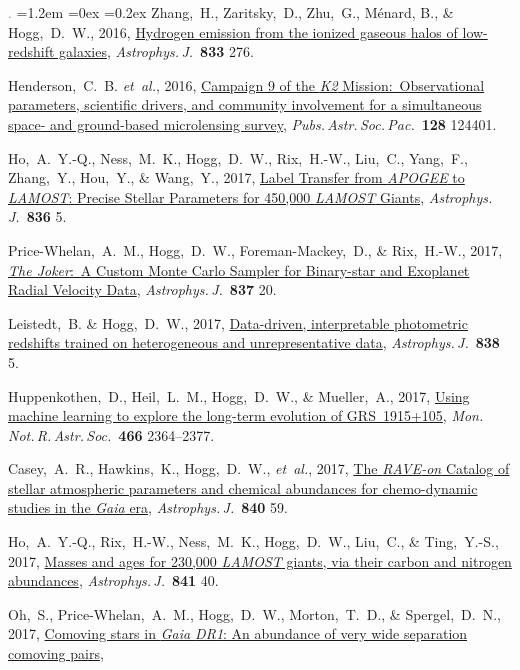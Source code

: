 \documentclass[10pt,letterpaper]{article}
\newcommand{\acronym}[1]{{\small{#1}}}
\newcommand{\foreign}[1]{\textsl{#1}}
\newcommand{\etal}{\foreign{et~al.}}
\newcommand{\project}[1]{\textsl{#1}}
\newcommand{\doi}[2]{\href{http://dx.doi.org/#1}{{#2}}}
\newcommand{\deemph}[1]{\textcolor{grey}{\footnotesize{#1}}}
\newcommand{\pubnumber}[1]{\deemph{{#1}.}}
\newcounter{refpubnum}
\newcommand{\hogglist}{%
    \rightmargin=0in
    \leftmargin=1.2em
    \topsep=0ex
    \partopsep=0pt
    \itemsep=0.2ex
    \parsep=0pt
    \itemindent=-1.0\leftmargin
    \listparindent=0.0\leftmargin
    \settowidth{\labelsep}{~}
    \usecounter{refpubnum}
  }
\begin{document}
\begin{list}{\pubnumber{\therefpubnum}}{\hogglist}
Zhang,~H., Zaritsky,~D., Zhu,~G., M\'enard, B., \& Hogg,~D.~W., 2016,
\doi{10.3847/1538-4357/833/2/276}{Hydrogen emission from the ionized gaseous halos of low-redshift galaxies},
\textit{Astrophys.\,J.}\ \textbf{833} 276.
\item
Henderson,~C.~B. \etal, 2016,
\doi{10.1088/1538-3873/128/970/124401}{Campaign 9 of the \project{\acronym{K2}} Mission:\ 
Observational parameters, scientific drivers, and community involvement
for a simultaneous space- and ground-based microlensing survey},
\textit{Pubs.\,Astr.\,Soc.\,Pac.}\ \textbf{128} 124401.
\item
Ho,~A.~Y.-Q., Ness,~M.~K., Hogg,~D.~W., Rix,~H.-W., Liu,~C., Yang,~F., Zhang,~Y.,
Hou,~Y., \& Wang,~Y., 2017,
\doi{10.3847/1538-4357/836/1/5}{Label Transfer from \project{\acronym{APOGEE}} to \project{\acronym{LAMOST}}: Precise Stellar Parameters for 450,000 \project{\acronym{LAMOST}} Giants},
\textit{Astrophys.\,J.}\ \textbf{836} 5.
\item
Price-Whelan,~A.~M., Hogg,~D.~W., Foreman-Mackey,~D., \& Rix,~H.-W., 2017,
\doi{10.3847/1538-4357/aa5e50}{\project{The Joker}:\ A Custom Monte Carlo Sampler for Binary-star and Exoplanet Radial Velocity Data},
\textit{Astrophys.\,J.}\ \textbf{837} 20.
\item
Leistedt,~B. \& Hogg,~D.~W., 2017,
\doi{10.3847/1538-4357/aa6332}{Data-driven, interpretable photometric redshifts trained on heterogeneous and unrepresentative data},
\textit{Astrophys.\,J.}\ \textbf{838} 5.
\item
Huppenkothen,~D., Heil,~L.~M., Hogg,~D.~W., \& Mueller,~A., 2017,
\doi{10.1093/mnras/stw3190}{Using machine learning to explore the long-term evolution of \acronym{GRS~1915+105}},
\textit{Mon.\,Not.\,R.\,Astr.\,Soc.}\ \textbf{466} 2364--2377.
\item
Casey,~A.~R., Hawkins,~K., Hogg,~D.~W., \etal, 2017,
\doi{10.3847/1538-4357/aa69c2}{The \project{\acronym{RAVE}-on} Catalog of stellar atmospheric parameters and chemical abundances for chemo-dynamic studies in the \project{Gaia} era},
\textit{Astrophys.\,J.}\ \textbf{840} 59.
\item
Ho,~A.~Y.-Q., Rix,~H.-W., Ness,~M.~K., Hogg,~D.~W., Liu,~C., \& Ting,~Y.-S., 2017,
\doi{10.3847/1538-4357/aa6db3}{Masses and ages for 230,000 \project{\acronym{LAMOST}} giants, via their carbon and nitrogen abundances},
\textit{Astrophys.\,J.}\ \textbf{841} 40.
\item
Oh,~S., Price-Whelan,~A.~M., Hogg,~D.~W., Morton,~T.~D., \& Spergel,~D.~N., 2017,
\doi{10.3847/1538-3881/aa6ffd}{Comoving stars in \project{Gaia \acronym{DR1}}: An abundance of very wide separation comoving pairs},

\end{list}
\end{document}
